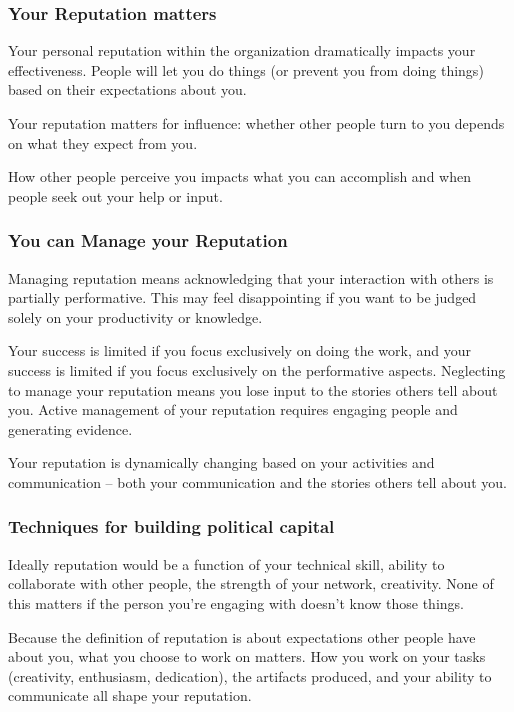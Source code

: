 \subsubsection{Your Reputation matters}

Your personal reputation within the organization dramatically impacts your effectiveness. People will let you do things (or prevent you from doing things) based on their expectations about you. 

Your reputation matters for influence: whether other people turn to you depends on what they expect from you. 

How other people perceive you impacts what you can accomplish and when people seek out your help or input.

\subsubsection{You can Manage your Reputation}

Managing reputation means acknowledging that your interaction with others is partially performative. This may feel disappointing if you want to be judged solely on your productivity or knowledge. 

Your success is limited if you focus exclusively on doing the work, and your success is limited if you focus exclusively on the performative aspects. 
Neglecting to manage your reputation means you lose input to the stories others tell about you. Active management of your reputation requires engaging people and generating evidence. 

Your reputation is dynamically changing based on your activities and communication -- both your communication and the stories others tell about you.


\subsubsection{Techniques for building political capital}

Ideally reputation would be a function of your technical skill, ability to collaborate with other people, the strength of your network, creativity. None of this matters if the person you're engaging with doesn't know those things. 


Because the definition of reputation is about expectations other people have about you, what you choose to work on matters. How you work on your tasks (creativity, enthusiasm, dedication), the artifacts produced, and your ability to communicate all shape your reputation. 

